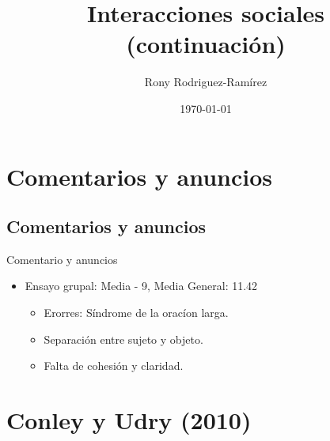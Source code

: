 \documentclass[11pt, aspectratio=169, compress]{beamer}
\title{Interacciones sociales (continuación)}
\author{Rony Rodriguez-Ramírez}
\institute{Economía Social y Humana | Grupo B018 \\Universidad Centroamericana}
\date{\today}
\begin{document}
	
\begin{frame}[plain]
	\maketitle  
\end{frame}

\section{Comentarios y anuncios}
\subsection{Comentarios y anuncios}
\begin{frame}{Comentario y anuncios}
\begin{itemize}
	\item Ensayo grupal: Media - 9, Media General: 11.42
	\begin{itemize}
		\item Erorres: Síndrome de la oracíon larga. 
		\item Separación entre sujeto y objeto. 
		\item Falta de cohesión y claridad. 
	\end{itemize}
\end{itemize}
\end{frame}
\section{Conley y Udry (2010)}
\end{document}
